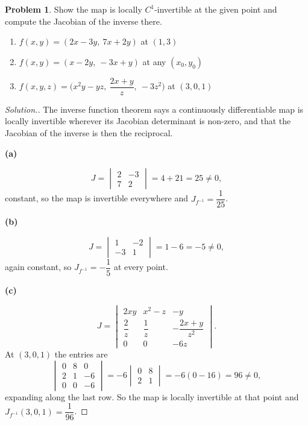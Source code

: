 \documentclass[11pt,a4paper]{article}
\theoremstyle{definition}
\newtheorem{problemx}{Problem}[subsection]
\newenvironment{problem}{\begin{problemx}}{\end{problemx}}
\newenvironment{solution}
  {\renewcommand{\qedsymbol}{}\begin{proof}[\textit{Solution}.]}
  {\end{proof}}
\newcommand{\subhead}[1]{%
  \par\medskip\noindent\textbf{#1}\par\nobreak\smallskip}
\begin{document}
\begin{problem}
Show the map is locally $C^1$-invertible at the given point and compute the
Jacobian of the inverse there.
\begin{enumerate}
\item[(a)] $f(x,y) = (2x-3y,\ 7x+2y)$ at $(1,3)$
\item[(b)] $f(x,y) = (x-2y,\ -3x+y)$ at any $(x_0,y_0)$
\item[(c)] $f(x,y,z) = \Big(x^2y-yz,\ \dfrac{2x+y}{z},\ -3z^2\Big)$ at $(3,0,1)$
\end{enumerate}
\end{problem}
\begin{solution}
The inverse function theorem says a continuously differentiable map is locally
invertible wherever its Jacobian determinant is non-zero, and that the Jacobian
of the inverse is then the reciprocal.

\subhead{(a)}
$$J = \begin{vmatrix}2 & -3\\ 7 & 2\end{vmatrix} = 4+21 = 25 \neq 0 ,$$
constant, so the map is invertible everywhere and
$J_{f^{-1}} = \dfrac{1}{25}$.

\subhead{(b)}
$$J = \begin{vmatrix}1 & -2\\ -3 & 1\end{vmatrix} = 1-6 = -5\neq 0 ,$$
again constant, so $J_{f^{-1}} = -\dfrac15$ at every point.

\subhead{(c)}
$$J = \begin{vmatrix}
2xy & x^2-z & -y\\
\dfrac{2}{z} & \dfrac{1}{z} & -\dfrac{2x+y}{z^2}\\
0 & 0 & -6z
\end{vmatrix}.$$
At $(3,0,1)$ the entries are
$$\begin{vmatrix}
0 & 8 & 0\\
2 & 1 & -6\\
0 & 0 & -6
\end{vmatrix}
= -6\begin{vmatrix}0 & 8\\ 2 & 1\end{vmatrix} = -6(0-16) = 96 \neq 0 ,$$
expanding along the last row. So the map is locally invertible at that point and
$J_{f^{-1}}(3,0,1) = \dfrac{1}{96}$.
\end{solution}
\end{document}

